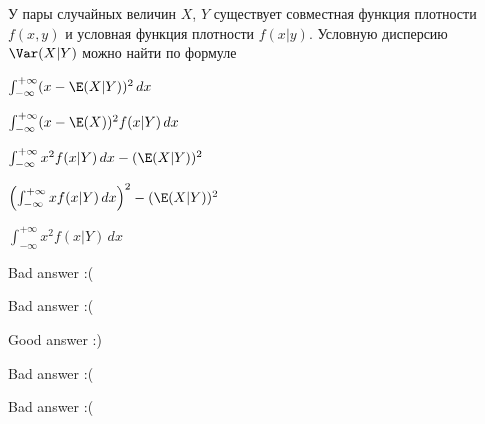 
\begin{question}
У пары случайных величин \(X\), \(Y\) существует совместная функция
плотности \(f(x,y)\) и условная функция плотности \(f(x|y)\). Условную
дисперсию \(\Var(X|Y)\) можно найти по формуле
\begin{answerlist}
  \item \(\int_{-\infty}^{+\infty} (x - \E(X|Y))^2 \, dx\)
  \item \(\int_{-\infty}^{+\infty} (x - \E(X))^2 f(x|Y) \, dx\)
  \item \(\int_{-\infty}^{+\infty} x^2 f(x|Y) \, dx - (\E(X|Y))^2\)
  \item \(\left(\int_{-\infty}^{+\infty} x f(x|Y) \, dx\right)^2 - (\E(X|Y))^2\)
  \item \(\int_{-\infty}^{+\infty} x^2 f(x|Y) \, dx\)
\end{answerlist}
\end{question}

\begin{solution}
\begin{answerlist}
  \item Bad answer :(
  \item Bad answer :(
  \item Good answer :)
  \item Bad answer :(
  \item Bad answer :(
\end{answerlist}
\end{solution}


